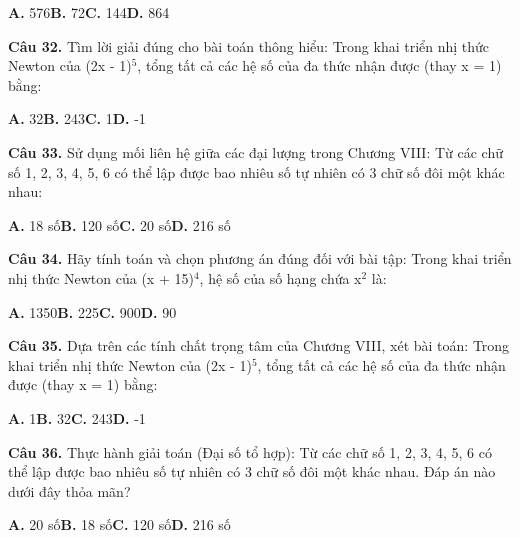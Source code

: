 \documentclass[11pt,a4paper]{article}
\begin{document}
\hspace*{1.5em}\textbf{A.} 576\quad\quad \textbf{B.} 72\quad\quad \textbf{C.} 144\quad\quad \textbf{D.} 864\par\vspace{2pt}
\textbf{\color{primary} Câu 32.} Tìm lời giải đúng cho bài toán thông hiểu: Trong khai triển nhị thức Newton của (2x - 1)$^5$, tổng tất cả các hệ số của đa thức nhận được (thay x = 1) bằng:\par
\hspace*{1.5em}\textbf{A.} 32\quad\quad \textbf{B.} 243\quad\quad \textbf{C.} 1\quad\quad \textbf{D.} -1\par\vspace{2pt}
\textbf{\color{primary} Câu 33.} Sử dụng mối liên hệ giữa các đại lượng trong Chương VIII: Từ các chữ số 1, 2, 3, 4, 5, 6 có thể lập được bao nhiêu số tự nhiên có 3 chữ số đôi một khác nhau:\par
\hspace*{1.5em}\textbf{A.} 18 số\quad\quad \textbf{B.} 120 số\quad\quad \textbf{C.} 20 số\quad\quad \textbf{D.} 216 số\par\vspace{2pt}
\textbf{\color{primary} Câu 34.} Hãy tính toán và chọn phương án đúng đối với bài tập: Trong khai triển nhị thức Newton của (x + 15)$^4$, hệ số của số hạng chứa x$^2$ là:\par
\hspace*{1.5em}\textbf{A.} 1350\quad\quad \textbf{B.} 225\quad\quad \textbf{C.} 900\quad\quad \textbf{D.} 90\par\vspace{2pt}
\textbf{\color{primary} Câu 35.} Dựa trên các tính chất trọng tâm của Chương VIII, xét bài toán: Trong khai triển nhị thức Newton của (2x - 1)$^5$, tổng tất cả các hệ số của đa thức nhận được (thay x = 1) bằng:\par
\hspace*{1.5em}\textbf{A.} 1\quad\quad \textbf{B.} 32\quad\quad \textbf{C.} 243\quad\quad \textbf{D.} -1\par\vspace{2pt}
\textbf{\color{primary} Câu 36.} Thực hành giải toán (Đại số tổ hợp): Từ các chữ số 1, 2, 3, 4, 5, 6 có thể lập được bao nhiêu số tự nhiên có 3 chữ số đôi một khác nhau. Đáp án nào dưới đây thỏa mãn?\par
\hspace*{1.5em}\textbf{A.} 20 số\quad\quad \textbf{B.} 18 số\quad\quad \textbf{C.} 120 số\quad\quad \textbf{D.} 216 số\par\vspace{2pt}
\end{document}
